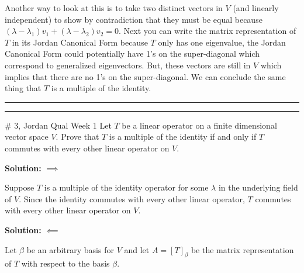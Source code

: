 \documentclass{article}
\begin{document}
Another way to look at this is to take two distinct vectors in $V$ (and linearly independent) to show by contradiction that they must be equal because $(\lambda - \lambda_1) v_1 + (\lambda - \lambda_2) v_2 = 0$. Next you can write the matrix representation of $T$ in its Jordan Canonical Form because $T$ only has one eigenvalue, the Jordan Canonical Form could potentially have 1's on the super-diagonal which correspond to generalized eigenvectors. But, these vectors are still in $V$ which implies that there are no 1's on the super-diagonal. We can conclude the same thing that $T$ is a multiple 
of the identity.\\

\hrule \vspace{2pt}
\hrule

\break 

\begin{problem}{\# 3, Jordan Qual Week 1} Let $T$ be a linear operator on a finite dimensional vector space $V$. Prove that
$T$ is a multiple of the identity if and only if $T$ commutes with every other linear operator on $V$. 
\end{problem}

\textbf{Solution:} $\implies$ 

Suppose $T$ is a multiple of the identity operator for some $\lambda$ in the underlying field of $V$. Since the identity commutes with every other linear operator, $T$ commutes with every other linear operator on $V$.


\textbf{Solution:} $\impliedby$ 

Let $\beta$ be an arbitrary basis for $V$ and let $A = [T]_\beta$ be the matrix representation of $T$ with respect to the basis $\beta$. 
\end{document}
